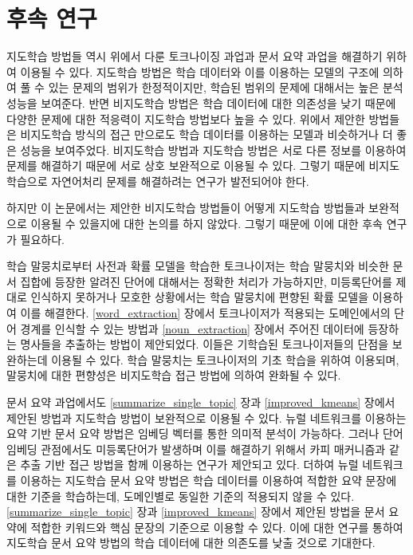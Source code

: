 \documentclass[oneside, ko,phd]{snuthesis_utf8_kor}
\begin{document}
\section{후속 연구}

지도학습 방법들 역시 위에서 다룬 토크나이징 과업과 문서 요약 과업을 해결하기 위하여 이용될 수 있다.
지도학습 방법은 학습 데이터와 이를 이용하는 모델의 구조에 의하여 풀 수 있는 문제의 범위가 한정적이지만, 학습된 범위의 문제에 대해서는 높은 분석 성능을 보여준다.
반면 비지도학습 방법은 학습 데이터에 대한 의존성을 낮기 때문에 다양한 문제에 대한 적응력이 지도학습 방법보다 높을 수 있다.
위에서 제안한 방법들은 비지도학습 방식의 접근 만으로도 학습 데이터를 이용하는 모델과 비슷하거나 더 좋은 성능을 보여주었다.
비지도학습 방법과 지도학습 방법은 서로 다른 정보를 이용하여 문제를 해결하기 때문에 서로 상호 보완적으로 이용될 수 있다.
그렇기 때문에 비지도학습으로 자연어처리 문제를 해결하려는 연구가 발전되어야 한다.

하지만 이 논문에서는 제안한 비지도학습 방법들이 어떻게 지도학습 방법들과 보완적으로 이용될 수 있을지에 대한 논의를 하지 않았다.
그렇기 때문에 이에 대한 후속 연구가 필요하다.

학습 말뭉치로부터 사전과 확률 모델을 학습한 토크나이저는 학습 말뭉치와 비슷한 문서 집합에 등장한 알려진 단어에 대해서는 정확한 처리가 가능하지만, 미등록단어를 제대로 인식하지 못하거나 모호한 상황에서는 학습 말뭉치에 편향된 확률 모델을 이용하여 이를 해결한다.
\ref{word_extraction} 장에서 토크나이저가 적용되는 도메인에서의 단어 경계를 인식할 수 있는 방법과 \ref{noun_extraction} 장에서 주어진 데이터에 등장하는 명사들을 추출하는 방법이 제안되었다.
이들은 기학습된 토크나이저들의 단점을 보완하는데 이용될 수 있다.
학습 말뭉치는 토크나이저의 기초 학습을 위하여 이용되며, 말뭉치에 대한 편향성은 비지도학습 접근 방법에 의하여 완화될 수 있다.

문서 요약 과업에서도 \ref{summarize_single_topic} 장과 \ref{improved_kmeans} 장에서 제안된 방법과 지도학습 방법이 보완적으로 이용될 수 있다.
뉴럴 네트워크를 이용하는 요약 기반 문서 요약 방법은 임베딩 벡터를 통한 의미적 분석이 가능하다.
그러나 단어 임베딩 관점에서도 미등록단어가 발생하며 이를 해결하기 위해서 카피 매커니즘과 같은 추출 기반 접근 방법을 함께 이용하는 연구가 제안되고 있다.
더하여 뉴럴 네트워크를 이용하는 지도학습 문서 요약 방법은 학습 데이터를 이용하여 적합한 요약 문장에 대한 기준을 학습하는데, 도메인별로 동일한 기준의 적용되지 않을 수 있다.
\ref{summarize_single_topic} 장과 \ref{improved_kmeans} 장에서 제안된 방법을 문서 요약에 적합한 키워드와 핵심 문장의 기준으로 이용할 수 있다.
이에 대한 연구를 통하여 지도학습 문서 요약 방법의 학습 데이터에 대한 의존도를 낮출 것으로 기대한다.
\end{document}
